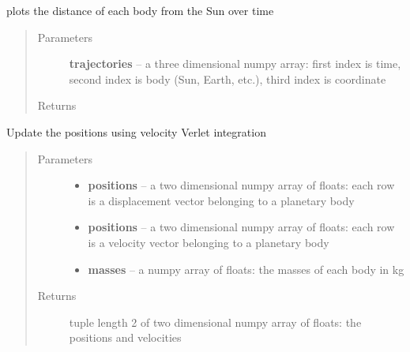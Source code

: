 \documentclass[letterpaper,10pt,english]{sphinxmanual}
\begin{document}

\begin{fulllineitems}
\label{index:orbital.plot_radii}
plots the distance of each body from the Sun over time
\begin{quote}\begin{description}
\item[{Parameters}] \leavevmode
\textbf{trajectories} -- a three dimensional numpy array: first index is time, second index is body (Sun, Earth, etc.), third index is coordinate

\item[{Returns}] \leavevmode
{}

\end{description}\end{quote}

\end{fulllineitems}


\begin{fulllineitems}
\label{index:orbital.update_pos}
Update the positions using velocity Verlet integration
\begin{quote}\begin{description}
\item[{Parameters}] \leavevmode\begin{itemize}
\item {} 
\textbf{positions} -- a two dimensional numpy array of floats: each row is a displacement vector belonging to a planetary body

\item {} 
\textbf{positions} -- a two dimensional numpy array of floats: each row is a velocity vector belonging to a planetary body

\item {} 
\textbf{masses} -- a numpy array of floats: the masses of each body in kg

\end{itemize}

\item[{Returns}] \leavevmode
tuple length 2 of two dimensional numpy array of floats: the positions and velocities

\end{description}\end{quote}

\end{fulllineitems}
\end{document}

